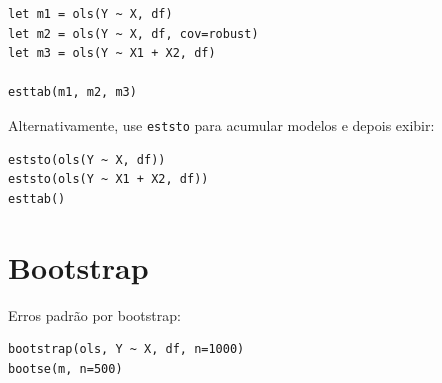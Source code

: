 \begin{lstlisting}[caption={Comparação de especificações}]
let m1 = ols(Y ~ X, df)
let m2 = ols(Y ~ X, df, cov=robust)
let m3 = ols(Y ~ X1 + X2, df)

esttab(m1, m2, m3)
\end{lstlisting}

Alternativamente, use \lstinline{eststo} para acumular modelos e depois exibir:

\begin{lstlisting}
eststo(ols(Y ~ X, df))
eststo(ols(Y ~ X1 + X2, df))
esttab()
\end{lstlisting}

\section{Bootstrap}

Erros padrão por bootstrap:

\begin{lstlisting}
bootstrap(ols, Y ~ X, df, n=1000)
bootse(m, n=500)
\end{lstlisting}
